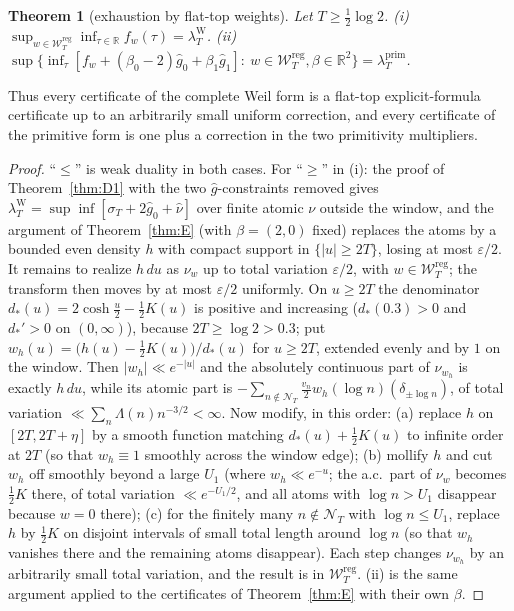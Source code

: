 \documentclass[11pt]{amsart}
\newtheorem{theorem}{Theorem}[section]
\theoremstyle{definition}
\theoremstyle{remark}
\newcommand{\R}{\mathbb R}
\newcommand{\lamP}{\lambda^{\mathrm{prim}}_T}
\newcommand{\lamW}{\lambda^{\mathrm W}_T}
\newcommand{\sT}{\sigma_T}
\newcommand{\gh}[1]{\widehat g_{#1}}
\newcommand{\nuh}{\widehat\nu}
\newcommand{\Wcl}{\mathcal W_T}
\newcommand{\NT}{\mathcal N_T}
\begin{document}
\begin{theorem}[exhaustion by flat-top weights]\label{thm:Zexh}
Let $T\ge\frac12\log2$. \emph{(i)} $\sup_{w\in\Wcl^{\mathrm{reg}}}\inf_{\tau\in\R}f_w(\tau)=\lamW$.
\emph{(ii)} $\sup\{\inf_\tau[f_w+(\beta_0-2)\gh0+\beta_1\gh1]:\ w\in\Wcl^{\mathrm{reg}},\beta\in\R^2\}=\lamP$.
\end{theorem}
Thus every certificate of the complete Weil form is a flat-top explicit-formula certificate up to
an arbitrarily small uniform correction, and every certificate of the primitive form is one plus a
correction in the two primitivity multipliers.
\begin{proof}
``$\le$'' is weak duality in both cases. For ``$\ge$'' in (i): the proof of Theorem~\ref{thm:D1}
with the two $\widehat g$-constraints removed gives $\lamW=\sup\inf[\sT+2\gh0+\nuh]$ over finite
atomic $\nu$ outside the window, and the argument of Theorem~\ref{thm:E} (with $\beta=(2,0)$
fixed) replaces the atoms by a bounded even density $h$ with compact support in $\{|u|\ge2T\}$,
losing at most $\varepsilon/2$. It remains to realize $h\,du$ as $\nu_w$ up to total variation
$\varepsilon/2$, with $w\in\Wcl^{\mathrm{reg}}$; the transform then moves by at most $\varepsilon/2$
uniformly. On $u\ge2T$ the denominator $d_*(u)=2\cosh\frac u2-\frac12K(u)$ is positive and increasing
($d_*(0.3)>0$ and $d_*'>0$ on $(0,\infty)$), because $2T\ge\log2>0.3$; put
$w_h(u)=\big(h(u)-\tfrac12K(u)\big)/d_*(u)$ for $u\ge2T$, extended evenly and by $1$ on the window.
Then $|w_h|\ll e^{-|u|}$ and the absolutely continuous part of $\nu_{w_h}$ is exactly $h\,du$, while
its atomic part is $-\sum_{n\notin\NT}\frac{v_n}2w_h(\log n)(\delta_{\pm\log n})$, of total variation
$\ll\sum_n\Lambda(n)n^{-3/2}<\infty$. Now modify, in this order: (a) replace $h$ on $[2T,2T+\eta]$
by a smooth function matching $d_*(u)+\frac12K(u)$ to infinite order at $2T$ (so that $w_h\equiv1$
smoothly across the window edge); (b) mollify $h$ and cut $w_h$ off smoothly beyond a large $U_1$
(where $w_h\ll e^{-u}$; the a.c.\ part of $\nu_w$ becomes $\frac12K$ there, of total variation
$\ll e^{-U_1/2}$, and all atoms with $\log n>U_1$ disappear because $w=0$ there); (c) for the finitely
many $n\notin\NT$ with $\log n\le U_1$, replace $h$ by $\frac12K$ on disjoint intervals of small total
length around $\log n$ (so that $w_h$ vanishes there and the remaining atoms disappear). Each step
changes $\nu_{w_h}$ by an arbitrarily small total variation, and the result is in
$\Wcl^{\mathrm{reg}}$. (ii) is the same argument applied to the certificates of Theorem~\ref{thm:E}
with their own $\beta$.
\end{proof}
\end{document}
